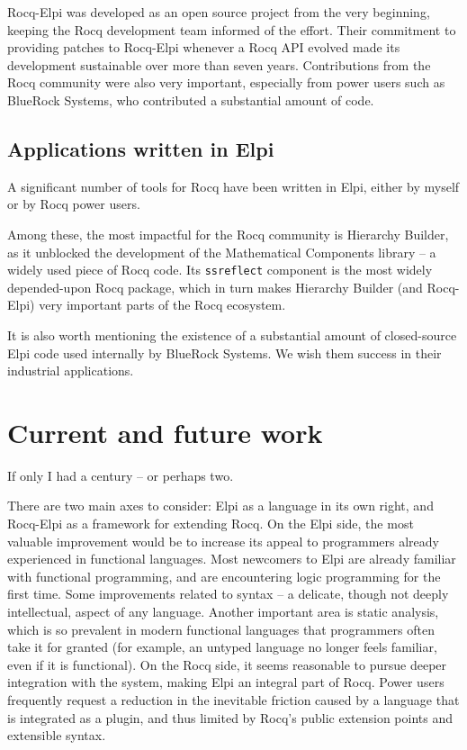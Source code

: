 \documentclass[a4paper, 11pt]{book}
\begin{document}
Rocq-Elpi was developed as an open source project from the very beginning,
keeping the Rocq development team informed of the effort. Their commitment to
providing patches to Rocq-Elpi whenever a Rocq API evolved made its development
sustainable over more than seven years. Contributions from the Rocq community
were also very important, especially from power users such as BlueRock Systems,
who contributed a substantial amount of code.

\subsection{Applications written in Elpi}

A significant number of tools for Rocq have been written in Elpi, either by
myself or by Rocq power users.

Among these, the most impactful for the Rocq community is Hierarchy Builder, as
it unblocked the development of the Mathematical Components library -- a
widely used piece of Rocq code. Its \texttt{ssreflect} component is the most widely
depended-upon Rocq package, which in turn makes Hierarchy Builder (and
Rocq-Elpi) very important parts of the Rocq ecosystem.

It is also worth mentioning the existence of a substantial amount of
closed-source Elpi code used internally by BlueRock Systems. We wish them
success in their industrial applications.

\section{Current and future work}

If only I had a century -- or perhaps two. 

There are two main axes to consider:
Elpi as a language in its own right, and Rocq-Elpi as a framework for extending
Rocq. On the Elpi side, the most valuable improvement would be to increase its
appeal to programmers already experienced in functional languages. Most
newcomers to Elpi are already familiar with functional programming, and are
encountering logic programming for the first time. Some improvements related to
syntax -- a delicate, though not deeply intellectual, aspect of any language.
Another important area is static analysis, which is so prevalent in modern
functional languages that programmers often take it for granted (for example,
an untyped language no longer feels familiar, even if it is functional). On the
Rocq side, it seems reasonable to pursue deeper integration with the system,
making Elpi an integral part of Rocq. Power users frequently request a
reduction in the inevitable friction caused by a language that is integrated as
a plugin, and thus limited by Rocq’s public extension points and extensible
syntax.
\end{document}
